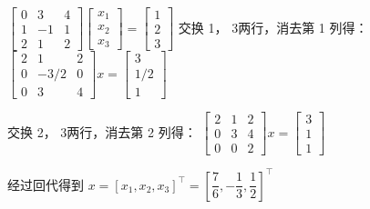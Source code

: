 \documentclass{article}
\begin{document}
\begin{itemize}
    $\left[\begin{array}{ccc}0 & 3 & 4 \\ 1 & -1 & 1 \\ 2 & 1 & 2\end{array}\right]\left[\begin{array}{c}x_1\\x_2\\x_3\end{array}\right] = \left[\begin{array}{c}1\\2\\3\end{array}\right]$
    交换 1， 3两行，消去第 1 列得：
    $\left[\begin{array}{ccc}2&1&2\\0&-3/2&0\\0&3&4\end{array}\right]x = \left[\begin{array}{c}3\\1/2\\1\end{array}\right]$

    交换 2， 3两行，消去第 2 列得：
    $\left[\begin{array}{ccc}2&1&2\\0&3&4\\0&0&2\end{array}\right]x = \left[\begin{array}{c}3\\1\\1\end{array}\right]$

    经过回代得到 $x = [x_1, x_2, x_3]^\top = \left[\dfrac{7}{6},-\dfrac{1}{3},\dfrac{1}{2}\right]^\top$


\end{itemize}
\end{document}

